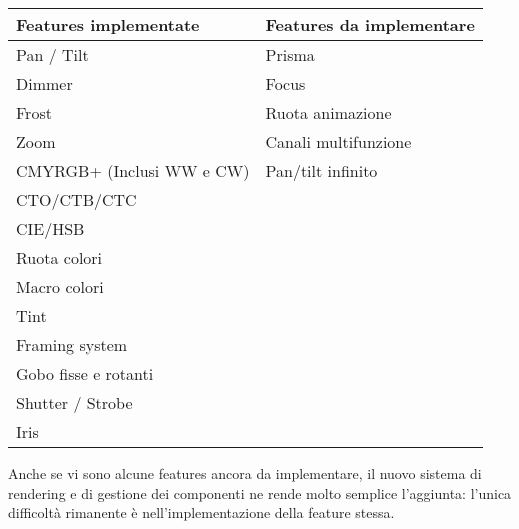 \documentclass[main.tex]{subfiles}
\begin{document}
\noindent\begin{tabularx}{1\textwidth} { | >{\centering\arraybackslash}X | >{\centering\arraybackslash}X | }
    \hline
        \textbf{Features implementate}	& \textbf{Features da implementare}	\\
    \hline
        Pan / Tilt						& Prisma							\\
    \hline
        Dimmer							& Focus								\\
    \hline
        Frost							& Ruota animazione					\\
    \hline
        Zoom							& Canali multifunzione				\\
    \hline
        CMYRGB+ (Inclusi WW e CW)		& Pan/tilt infinito					\\
    \hline
        CTO/CTB/CTC						& 									\\
    \hline
        CIE/HSB							& 									\\
    \hline
        Ruota colori					& 									\\
    \hline
        Macro colori					& 									\\
    \hline
        Tint							& 									\\
    \hline
        Framing system					& 									\\
    \hline
        Gobo fisse e rotanti			& 									\\
    \hline
        Shutter / Strobe				& 									\\
    \hline
        Iris							& 									\\
    \hline
\end{tabularx}
\newline

Anche se vi sono alcune features ancora da implementare, il nuovo sistema di rendering e di gestione dei componenti ne rende molto semplice l'aggiunta: l'unica difficoltà rimanente è nell'implementazione della feature stessa.
\end{document}
